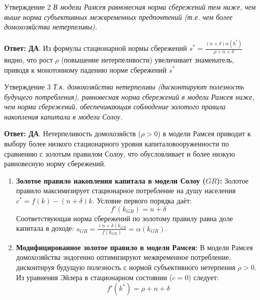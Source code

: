 \documentclass[10pt,a4paper]{article}
\newcommand{\qda}{\textbf{\color{yesgreen}Ответ: ДА}}
\newenvironment{answer}[2]{%
  \begin{qbox}{Утверждение #1}
  \textit{#2}\par\smallskip
}{%
  \end{qbox}\vspace{2pt}
}
\begin{document}
\begin{answer}{2}{В модели Рамсея равновесная норма сбережений тем ниже, чем выше норма субъективных межвременных предпочтений (т.е. чем более домохозяйства нетерпеливы).}
\qda. Из формулы стационарной нормы сбережений $s^* = \frac{(n+\delta)\alpha(k^*)}{\rho + n + \delta}$ видно, что рост $\rho$ (повышение нетерпеливости) увеличивает знаменатель, приводя к монотонному падению норме сбережений $s^*$
\end{answer}

\begin{answer}{3}{Т.к. домохозяйства нетерпеливы (дисконтируют полезность будущего потребления), равновесная норма сбережений в модели Рамсея ниже, чем норма сбережений, обеспечивающая соблюдение золотого правила накопления капитала в модели Солоу.}
\qda. Нетерпеливость домохозяйств ($\rho > 0$) в модели Рамсея приводит к выбору более низкого стационарного уровня капиталовооруженности по сравнению с золотым правилом Солоу, что обусловливает и более низкую равновесную норму сбережений.

\begin{enumerate}
    \item \textbf{Золотое правило накопления капитала в модели Солоу ($GR$):}
    Золотое правило максимизирует стационарное потребление на душу населения $c^* = f(k) - (n + \delta)k$. Условие первого порядка даёт:
    \[
    f'(k_{GR}) = n + \delta
    \]
    Соответствующая норма сбережений по золотому правилу равна доле капитала в доходе: $s_{GR} = \frac{(n+\delta)k_{GR}}{f(k_{GR})} = \alpha(k_{GR})$.

    \item \textbf{Модифицированное золотое правило в модели Рамсея:}
    В модели Рамсея домохозяйства эндогенно оптимизируют межвременное потребление, дисконтируя будущую полезность с нормой субъективного нетерпения $\rho > 0$. Из уравнения Эйлера в стационарном состоянии ($\dot{c} = 0$) следует:
    \[
    f'(k^*) = \rho + n + \delta
    \]


\end{enumerate}
\end{answer}
\end{document}

